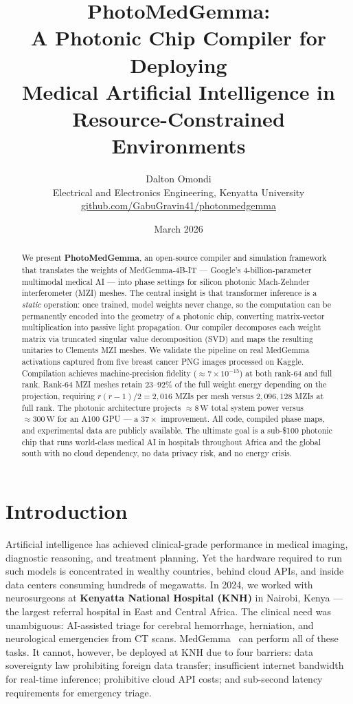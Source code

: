 \documentclass[12pt, a4paper]{article}
\title{\textbf{PhotoMedGemma:}\\[4pt]
       \large A Photonic Chip Compiler for Deploying\\
       Medical Artificial Intelligence in\\
       Resource-Constrained Environments}
\author{
   Dalton Omondi\\[2pt]
  \small Electrical and Electronics Engineering, Kenyatta University\\[2pt]
  \small \href{https://github.com/GabuGravin41/photonmedgemma}{github.com/GabuGravin41/photonmedgemma}
}
\date{March 2026}
\begin{document}
\maketitle

\begin{abstract}
We present \textbf{PhotoMedGemma}, an open-source compiler and simulation
framework that translates the weights of MedGemma-4B-IT --- Google's
4-billion-parameter multimodal medical AI --- into phase settings for silicon
photonic Mach-Zehnder interferometer (MZI) meshes.
The central insight is that transformer inference is a \emph{static} operation:
once trained, model weights never change, so the computation can be permanently
encoded into the geometry of a photonic chip, converting matrix-vector
multiplication into passive light propagation.
Our compiler decomposes each weight matrix via truncated singular value
decomposition (SVD) and maps the resulting unitaries to Clements MZI meshes.
We validate the pipeline on real MedGemma activations captured from five
breast cancer PNG images processed on Kaggle.
Compilation achieves machine-precision fidelity ($\approx 7 \times 10^{-15}$)
at both rank-64 and full rank.
Rank-64 MZI meshes retain $23$--$92\%$ of the full weight energy
depending on the projection, requiring $r(r-1)/2 = 2{,}016$ MZIs per mesh
versus $2{,}096{,}128$ MZIs at full rank.
The photonic architecture projects $\approx 8\,\text{W}$ total system power
versus $\approx 300\,\text{W}$ for an A100 GPU --- a $37\times$ improvement.
All code, compiled phase maps, and experimental data are publicly available.
The ultimate goal is a sub-\$100 photonic chip that runs world-class medical AI
in hospitals throughout Africa and the global south with no cloud dependency,
no data privacy risk, and no energy crisis.
\end{abstract}

\section{Introduction}
\label{sec:intro}

Artificial intelligence has achieved clinical-grade performance in medical
imaging, diagnostic reasoning, and treatment planning.
Yet the hardware required to run such models is concentrated in wealthy
countries, behind cloud APIs, and inside data centers consuming hundreds of
megawatts.
In 2024, we worked with neurosurgeons at \textbf{Kenyatta National Hospital
(KNH)} in Nairobi, Kenya --- the largest referral hospital in East and Central
Africa.
The clinical need was unambiguous: AI-assisted triage for cerebral hemorrhage,
herniation, and neurological emergencies from CT scans.
MedGemma~\cite{medgemma2024} can perform all of these tasks.
It cannot, however, be deployed at KNH due to four barriers: data sovereignty
law prohibiting foreign data transfer; insufficient internet bandwidth for
real-time inference; prohibitive cloud API costs; and sub-second latency
requirements for emergency triage.
\end{document}

